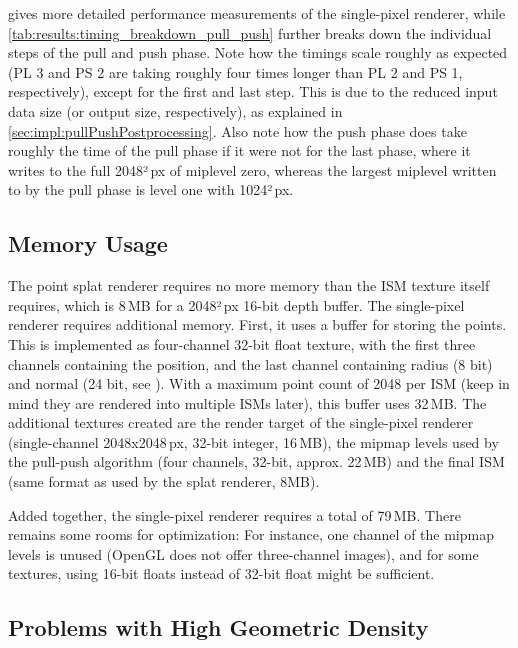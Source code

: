 \noindent
{} gives more detailed performance measurements of the single-pixel renderer, while \cref{tab:results:timing_breakdown_pull_push} further breaks down the individual steps of the pull and push phase. Note how the timings scale roughly as expected (PL 3 and PS 2 are taking roughly four times longer than PL 2 and PS 1, respectively), except for the first and last step. This is due to the reduced input data size (or output size, respectively), as explained in \cref{sec:impl:pullPushPostprocessing}. Also note how the push phase does take roughly the time of the pull phase if it were not for the last phase, where it writes to the full 2048²\,px of miplevel zero, whereas the largest miplevel written to by the pull phase is level one with 1024²\,px.



\subsection{Memory Usage}
\label{sec:results:ism:memory}

The point splat renderer requires no more memory than the ISM texture itself requires, which is 8\,MB for a 2048²\,px 16-bit depth buffer. The single-pixel renderer requires additional memory. First, it uses a buffer for storing the points. This is implemented as four-channel 32-bit float texture, with the first three channels containing the position, and the last channel containing radius (8 bit) and normal (24 bit, see \cite{Cigolle:2014:NormalPacking}). With a maximum point count of 2048 per ISM (keep in mind they are rendered into multiple ISMs later), this buffer uses 32\,MB.
The additional textures created are the render target of the single-pixel renderer (single-channel 2048x2048\,px, 32-bit integer, 16\,MB), the mipmap levels used by the pull-push algorithm (four channels, 32-bit, approx. 22\,MB) and the final ISM (same format as used by the splat renderer, 8MB).

Added together, the single-pixel renderer requires a total of 79\,MB. There remains some rooms for optimization: For instance, one channel of the mipmap levels is unused (OpenGL does not offer three-channel images), and for some textures, using 16-bit floats instead of 32-bit float might be sufficient.


\subsection{Problems with High Geometric Density}
\label{sec:results:ism:densityProblems}

